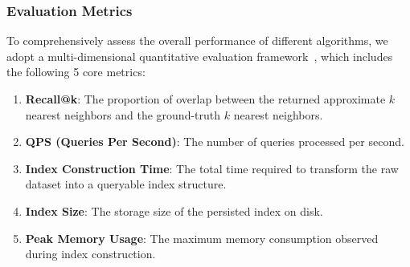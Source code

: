 \documentclass[sigconf, nonacm]{acmart}
\begin{document}
	\setlength{\textfloatsep}{0.1cm}
	\setlength{\floatsep}{0cm}
	\renewcommand{\arraystretch}{0.9}
	\begin{table}[t]
		\centering
		

		\setlength{\abovecaptionskip}{0cm}
		\setlength{\belowcaptionskip}{-0.3cm}
		\caption{Datasets}
		
		\label{tab:datasets_combined}
	\end{table}
	
	
	
	\subsubsection{Evaluation Metrics}
	
	To comprehensively assess the overall performance of different algorithms, we adopt a multi-dimensional quantitative evaluation framework~\cite{compare}, which includes the following 5 core metrics:
	
	\begin{enumerate}
		
		\item \textbf{Recall@k}: The proportion of overlap between the returned approximate $k$ nearest neighbors and the ground-truth $k$ nearest neighbors.
		\item \textbf{QPS (Queries Per Second)}: The number of queries processed per second.
		\item \textbf{Index Construction Time}: The total time required to transform the raw dataset into a queryable index structure.
		\item \textbf{Index Size}: The storage size of the persisted index on disk.
		\item \textbf{Peak Memory Usage}: The maximum memory consumption observed during index construction.
	\end{enumerate}
	
\end{document}
